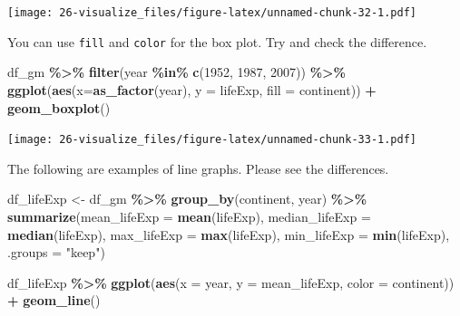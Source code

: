 \documentclass[
  xelatex, ja=standard]{bxjsbook}
\newenvironment{Shaded}{\begin{snugshade}}{\end{snugshade}}
\newcommand{\AttributeTok}[1]{\textcolor[rgb]{0.13,0.29,0.53}{#1}}
\newcommand{\DecValTok}[1]{\textcolor[rgb]{0.00,0.00,0.81}{#1}}
\newcommand{\FunctionTok}[1]{\textcolor[rgb]{0.13,0.29,0.53}{\textbf{#1}}}
\newcommand{\NormalTok}[1]{#1}
\newcommand{\OtherTok}[1]{\textcolor[rgb]{0.56,0.35,0.01}{#1}}
\newcommand{\SpecialCharTok}[1]{\textcolor[rgb]{0.81,0.36,0.00}{\textbf{#1}}}
\newcommand{\StringTok}[1]{\textcolor[rgb]{0.31,0.60,0.02}{#1}}
\theoremstyle{definition}
\theoremstyle{definition}
\theoremstyle{definition}
\theoremstyle{definition}
\theoremstyle{remark}
\begin{document}
\texttt{[image: 26-visualize\_files/figure-latex/unnamed-chunk-32-1.pdf]}

You can use \texttt{fill} and \texttt{color} for the box plot. Try and check the difference.

\begin{Shaded}
\begin{Highlighting}[]
\NormalTok{df\_gm }\SpecialCharTok{\%\textgreater{}\%} \FunctionTok{filter}\NormalTok{(year }\SpecialCharTok{\%in\%} \FunctionTok{c}\NormalTok{(}\DecValTok{1952}\NormalTok{, }\DecValTok{1987}\NormalTok{, }\DecValTok{2007}\NormalTok{)) }\SpecialCharTok{\%\textgreater{}\%}
  \FunctionTok{ggplot}\NormalTok{(}\FunctionTok{aes}\NormalTok{(}\AttributeTok{x=}\FunctionTok{as\_factor}\NormalTok{(year), }\AttributeTok{y =}\NormalTok{ lifeExp, }\AttributeTok{fill =}\NormalTok{ continent)) }\SpecialCharTok{+}
  \FunctionTok{geom\_boxplot}\NormalTok{()}
\end{Highlighting}
\end{Shaded}

\texttt{[image: 26-visualize\_files/figure-latex/unnamed-chunk-33-1.pdf]}

The following are examples of line graphs. Please see the differences.

\begin{Shaded}
\begin{Highlighting}[]
\NormalTok{df\_lifeExp }\OtherTok{\textless{}{-}}\NormalTok{ df\_gm }\SpecialCharTok{\%\textgreater{}\%} 
  \FunctionTok{group\_by}\NormalTok{(continent, year) }\SpecialCharTok{\%\textgreater{}\%} 
  \FunctionTok{summarize}\NormalTok{(}\AttributeTok{mean\_lifeExp =} \FunctionTok{mean}\NormalTok{(lifeExp), }\AttributeTok{median\_lifeExp =} \FunctionTok{median}\NormalTok{(lifeExp), }\AttributeTok{max\_lifeExp =} \FunctionTok{max}\NormalTok{(lifeExp), }\AttributeTok{min\_lifeExp =} \FunctionTok{min}\NormalTok{(lifeExp), }\AttributeTok{.groups =} \StringTok{"keep"}\NormalTok{)}
\end{Highlighting}
\end{Shaded}

\begin{Shaded}
\begin{Highlighting}[]
\NormalTok{df\_lifeExp }\SpecialCharTok{\%\textgreater{}\%} \FunctionTok{ggplot}\NormalTok{(}\FunctionTok{aes}\NormalTok{(}\AttributeTok{x =}\NormalTok{ year, }\AttributeTok{y =}\NormalTok{ mean\_lifeExp, }\AttributeTok{color =}\NormalTok{ continent)) }\SpecialCharTok{+}
  \FunctionTok{geom\_line}\NormalTok{()}
\end{Highlighting}
\end{Shaded}
\end{document}
